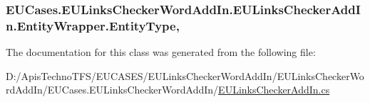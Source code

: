 \hypertarget{class_e_u_cases_1_1_e_u_links_checker_word_add_in_1_1_e_u_links_checker_add_in_1_1_entity_wrapper_ae86f805c4a65c4b7497e8f0c711ea9fc}{
\subsubsection[{Entity\+Type}]{ E\+U\+Cases.\+E\+U\+Links\+Checker\+Word\+Add\+In.\+E\+U\+Links\+Checker\+Add\+In.\+Entity\+Wrapper.\+Entity\+Type\hspace{0.3cm}{\ttfamily [get]}, {\ttfamily [set]}}}\label{class_e_u_cases_1_1_e_u_links_checker_word_add_in_1_1_e_u_links_checker_add_in_1_1_entity_wrapper_ae86f805c4a65c4b7497e8f0c711ea9fc}


The documentation for this class was generated from the following file\+:\begin{DoxyCompactItemize}
\item 
D\+:/\+Apis\+Techno\+T\+F\+S/\+E\+U\+C\+A\+S\+E\+S/\+E\+U\+Links\+Checker\+Word\+Add\+In/\+E\+U\+Links\+Checker\+Word\+Add\+In/\+E\+U\+Cases.\+E\+U\+Links\+Checker\+Word\+Add\+In/\hyperlink{_e_u_links_checker_add_in_8cs}{E\+U\+Links\+Checker\+Add\+In.\+cs}\end{DoxyCompactItemize}

